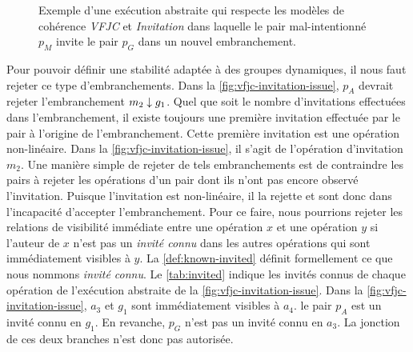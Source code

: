 \begin{figure}[htb]
\centering
{}
\caption{Exemple  d'une exécution abstraite qui respecte les modèles de cohérence \emph{VFJC} et \emph{Invitation} dans laquelle le pair mal-intentionné $p_M$ invite le pair $p_G$ dans un nouvel embranchement.}\label{fig:vfjc-invitation-issue}
\end{figure}

Pour pouvoir définir une stabilité adaptée à des groupes dynamiques, il nous faut rejeter ce type d'embranchements.
Dans la \autoref{fig:vfjc-invitation-issue}, $p_A$ devrait rejeter l'embranchement $m_2 \downarrow g_1$.
Quel que soit le nombre d'invitations effectuées dans l'embranchement, il existe toujours une première invitation effectuée par le pair à l'origine de l'embranchement.
Cette première invitation est une opération non-linéaire.
Dans la \autoref{fig:vfjc-invitation-issue}, il s'agit de l'opération d'invitation $m_2$.
Une manière simple de rejeter de tels embranchements est de contraindre les pairs à rejeter les opérations d'un pair dont ils n'ont pas encore observé l'invitation.
Puisque l'invitation est non-linéaire, il la rejette et sont donc dans l'incapacité d'accepter l'embranchement.
Pour ce faire, nous pourrions rejeter les relations de visibilité immédiate entre une opération $x$ et une opération $y$ si l'auteur de $x$ n'est pas un \emph{invité connu} dans les autres opérations qui sont immédiatement visibles à $y$.
La \autoref{def:known-invited} définit formellement ce que nous nommons \emph{invité connu}.
Le \autoref{tab:invited} indique les invités connus de chaque opération de l'exécution abstraite de la \autoref{fig:vfjc-invitation-issue}.
Dans la \autoref{fig:vfjc-invitation-issue}, $a_3$ et $g_1$ sont immédiatement visibles à $a_4$.
le pair $p_A$ est un invité connu en $g_1$.
En revanche, $p_G$ n'est pas un invité connu en $a_3$.
La jonction de ces deux branches n'est donc pas autorisée.

